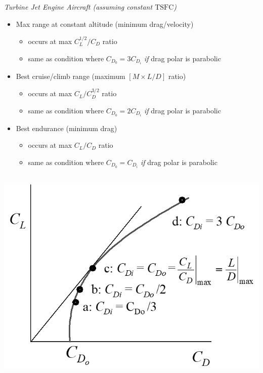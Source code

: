\documentclass[
]{book}
\providecommand{\tightlist}{%
  \setlength{\itemsep}{0pt}\setlength{\parskip}{0pt}}
\begin{document}
\emph{Turbine Jet Engine Aircraft (assuming constant \(\mathrm{TSFC}\))}

\begin{itemize}
\tightlist
\item
  Max range at constant altitude (minimum drag/velocity)

  \begin{itemize}
  \tightlist
  \item
    occurs at max \(C_L^{1/2} / C_D\) ratio
  \item
    same as condition where \(C_{D_0} = 3C_{D_i}\) \emph{if} drag polar is parabolic
  \end{itemize}
\item
  Best cruise/climb range (maximum \(\left[M \times L/D \right]\) ratio)

  \begin{itemize}
  \tightlist
  \item
    occurs at max \(C_L/C_D^{3/2}\) ratio
  \item
    same as condition where \(C_{D_0} = 2C_{D_i}\) \emph{if} drag polar is parabolic
  \end{itemize}
\item
  Best endurance (minimum drag)

  \begin{itemize}
  \tightlist
  \item
    occurs at max \(C_L/C_D\) ratio
  \item
    same as condition where \(C_{D_0} = C_{D_i}\) \emph{if} drag polar is parabolic
  \end{itemize}
\end{itemize}

\includegraphics[width=5.75in,height=4.174in]{media/05/image97.png}
\end{document}
